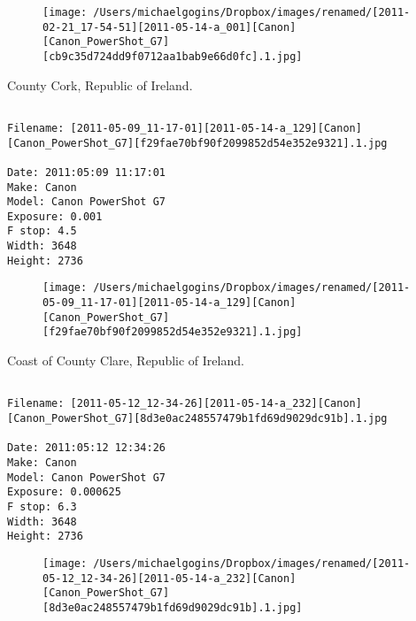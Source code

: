 \documentclass[11pt,letter,DIV=14,paper=landscape]{scrbook}
\begin{document}
\begin{figure}
\texttt{[image: /Users/michaelgogins/Dropbox/images/renamed/[2011-02-21\_17-54-51][2011-05-14-a\_001][Canon][Canon\_PowerShot\_G7][cb9c35d724dd9f0712aa1bab9e66d0fc].1.jpg]}
\end{figure}
    
\clearpage
\noindent County Cork, Republic of Ireland.
\noindent
\begin{lstlisting}

Filename: [2011-05-09_11-17-01][2011-05-14-a_129][Canon][Canon_PowerShot_G7][f29fae70bf90f2099852d54e352e9321].1.jpg

Date: 2011:05:09 11:17:01
Make: Canon
Model: Canon PowerShot G7
Exposure: 0.001
F stop: 4.5
Width: 3648
Height: 2736
\end{lstlisting}
\clearpage

\begin{figure}
\texttt{[image: /Users/michaelgogins/Dropbox/images/renamed/[2011-05-09\_11-17-01][2011-05-14-a\_129][Canon][Canon\_PowerShot\_G7][f29fae70bf90f2099852d54e352e9321].1.jpg]}
\end{figure}
    
\clearpage
\noindent Coast of County Clare, Republic of Ireland.
\noindent
\begin{lstlisting}

Filename: [2011-05-12_12-34-26][2011-05-14-a_232][Canon][Canon_PowerShot_G7][8d3e0ac248557479b1fd69d9029dc91b].1.jpg

Date: 2011:05:12 12:34:26
Make: Canon
Model: Canon PowerShot G7
Exposure: 0.000625
F stop: 6.3
Width: 3648
Height: 2736
\end{lstlisting}
\clearpage

\begin{figure}
\texttt{[image: /Users/michaelgogins/Dropbox/images/renamed/[2011-05-12\_12-34-26][2011-05-14-a\_232][Canon][Canon\_PowerShot\_G7][8d3e0ac248557479b1fd69d9029dc91b].1.jpg]}
\end{figure}
    
\end{document}
